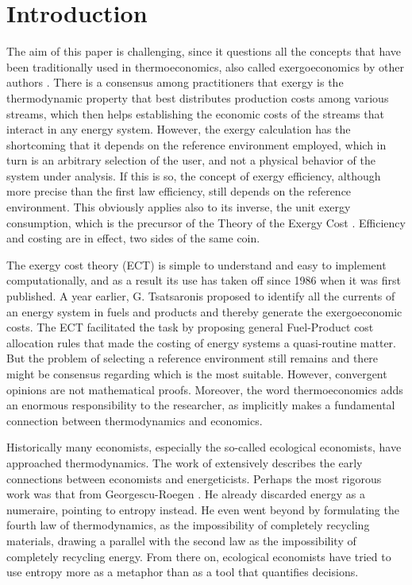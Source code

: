 \documentclass[energies,article,submit,moreauthors,pdftex]{Definitions/mdpi}
\begin{document}
\section{Introduction}
The aim of this paper is challenging, since it questions all the concepts that have been traditionally used in thermoeconomics, also called exergoeconomics by other authors \cite{Tsatsaronis1985b}. There is a consensus among practitioners that exergy is the thermodynamic property that best distributes production costs among various streams, which then helps establishing the economic costs of the streams that interact in any energy system. However, the exergy calculation has the shortcoming that it depends on the reference environment employed, which in turn is an arbitrary selection of the user, and not a physical behavior of the system under analysis. If this is so, the concept of exergy efficiency, although more precise than the first law efficiency, still depends on the reference environment. This obviously applies also to its inverse, the unit exergy consumption, which is the precursor of the Theory of the Exergy Cost \cite{Valero1986a,Lozano1993}. Efficiency and costing are in effect, two sides of the same coin.

The exergy cost theory (ECT) is simple to understand and easy to implement computationally, and as a result its use has taken off since 1986 when it was first published. A year earlier, G. Tsatsaronis proposed to identify all the currents of an energy system in fuels and products and thereby generate the exergoeconomic costs. The ECT facilitated the task by proposing general Fuel-Product cost allocation rules that made the costing of energy systems a quasi-routine matter. But the problem of selecting a reference environment still remains and there might be consensus regarding which is the most suitable. However, convergent opinions are not mathematical proofs. Moreover, the word thermoeconomics adds an enormous responsibility to the researcher, as implicitly makes a fundamental connection between thermodynamics and economics.

Historically many economists, especially the so-called ecological economists, have approached thermodynamics. The work of  \cite{MartinezAlier1987} extensively describes the early connections between economists and energeticists. Perhaps the most rigorous work was that from Georgescu-Roegen \cite{GeorgescuRoegen1971}. He already discarded energy as a numeraire, pointing to entropy instead. He even went beyond by formulating the fourth law of thermodynamics, as the impossibility of completely recycling materials, drawing a parallel with the second law as the impossibility of completely recycling energy. From there on, ecological economists have tried to use entropy more as a metaphor than as a tool that quantifies decisions.
\end{document}
